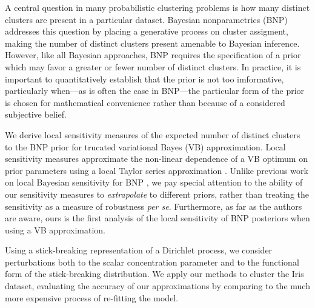
A central question in many probabilistic clustering problems is how many
distinct clusters are present in a particular dataset.
Bayesian nonparametrics (BNP) addresses this question by placing a generative
process on cluster assigment, making the number of distinct clusters present
amenable to Bayesian inference.  However, like all Bayesian approaches, BNP
requires the specification of a prior which may favor a greater or fewer number
of distinct clusters.
In practice, it is important to quantitatively establish that the prior is
not too imformative, particularly when---as is often the case in BNP---the
particular form of the prior is chosen for mathematical convenience rather than
because of a considered subjective belief.

We derive local sensitivity measures of the expected number of distinct clusters
to the BNP prior for trucated variational Bayes (VB) approximation.  Local
sensitivity measures approximate the non-linear dependence of a VB optimum on
prior parameters using a local Taylor series approximation
\citep{gustafson:1996:localposterior, giordano:2017:covariances}. Unlike
previous work on local Bayesian sensitivity for BNP
\citep{Basu:2000:BNP_robustness}, we pay special attention to the ability of our
sensitivity measures to \emph{extrapolate} to different priors, rather than
treating the sensitivity as a measure of robustness \textit{per se}.
Furthermore, as far as the authors are aware, ours is the first analysis of the
local sensitivity of BNP posteriors when using a VB approximation.


Using a stick-breaking representation of a Dirichlet process, we consider
perturbations both to the scalar concentration parameter and to the functional
form of the stick-breaking distribution. We apply our methods to cluster the
Iris \citep{iris_data_anderson, iris_data_fisher} dataset, evaluating the
accuracy of our approximations by comparing to the much more expensive process
of re-fitting the model.

